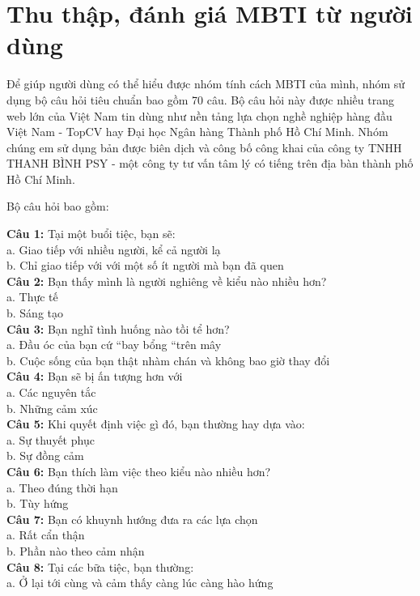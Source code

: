 \section{Thu thập, đánh giá MBTI từ người dùng}
Để giúp người dùng có thể hiểu được nhóm tính cách MBTI của mình, nhóm sử dụng bộ câu hỏi tiêu chuẩn bao gồm 70 câu. Bộ câu hỏi này được nhiều trang web lớn của Việt Nam tin dùng như nền tảng lựa chọn nghề nghiệp hàng đầu Việt Nam - TopCV hay Đại học Ngân hàng Thành phố Hồ Chí Minh. Nhóm chúng em sử dụng bản được biên dịch và công bố công khai của công ty TNHH THANH BÌNH PSY - một công ty tư vấn tâm lý có tiếng trên địa bàn thành phố Hồ Chí Minh.

Bộ câu hỏi bao gồm:
\begin{multicols}{2}
\noindent \textbf{Câu 1:} Tại một buổi tiệc, bạn sẽ: \\
a. Giao tiếp với nhiều người, kể cả người lạ \\
b. Chỉ giao tiếp với với một số ít người mà bạn đã quen \\
\textbf{Câu 2:} Bạn thấy mình là người nghiêng về kiểu nào nhiều hơn? \\
a. Thực tế \\
b. Sáng tạo \\
\textbf{Câu 3:} Bạn nghĩ tình huống nào tồi tể hơn? \\
a. Đầu óc của bạn cứ “bay bổng “trên mây \\
b. Cuộc sống của bạn thật nhàm chán và không bao giờ thay đổi \\
\textbf{Câu 4:} Bạn sẽ bị ấn tượng hơn với \\
a. Các nguyên tắc \\
b. Những cảm xúc \\
\textbf{Câu 5:} Khi quyết định việc gì đó, bạn thường hay dựa vào: \\
a. Sự thuyết phục \\
b. Sự đồng cảm \\
\textbf{Câu 6:} Bạn thích làm việc theo kiểu nào nhiều hơn? \\
a. Theo đúng thời hạn \\
b. Tùy hứng \\
\textbf{Câu 7:} Bạn có khuynh hướng đưa ra các lựa chọn \\
a. Rất cẩn thận \\
b. Phần nào theo cảm nhận \\
\textbf{Câu 8:} Tại các bữa tiệc, bạn thường: \\
a. Ở lại tới cùng và cảm thấy càng lúc càng hào hứng \\

\end{multicols}
